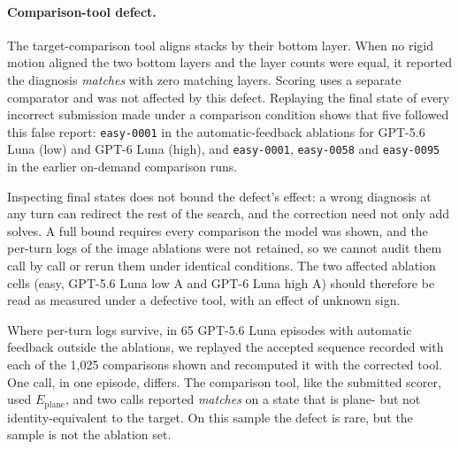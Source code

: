 \paragraph{Comparison-tool defect.} The target-comparison tool aligns stacks by their bottom
layer. When no rigid motion aligned the two bottom layers and the layer counts were equal, it
reported the diagnosis \emph{matches} with zero matching layers. Scoring uses a separate
comparator and was not affected by this defect. Replaying the final state of every incorrect
submission made under a comparison condition shows that five followed this false report:
\texttt{easy-0001} in the automatic-feedback ablations for GPT-5.6 Luna (low) and GPT-6 Luna
(high), and \texttt{easy-0001}, \texttt{easy-0058} and \texttt{easy-0095} in the earlier on-demand
comparison runs.

Inspecting final states does not bound the defect's effect: a wrong diagnosis at any turn can
redirect the rest of the search, and the correction need not only add solves. A full bound
requires every comparison the model was shown, and the per-turn logs of the image ablations were
not retained, so we cannot audit them call by call or rerun them under identical conditions. The
two affected ablation cells (easy, GPT-5.6 Luna low A and GPT-6 Luna high A) should therefore be
read as measured under a defective tool, with an effect of unknown sign.

Where per-turn logs survive, in 65 GPT-5.6 Luna episodes with automatic feedback outside the
ablations, we replayed the accepted sequence recorded with each of the 1,025 comparisons shown and
recomputed it with the corrected tool. One call, in one episode, differs. The comparison tool,
like the submitted scorer, used $E_{\mathrm{plane}}$, and two calls reported \emph{matches} on a
state that is plane- but not identity-equivalent to the target. On this sample the defect is rare,
but the sample is not the ablation set.


